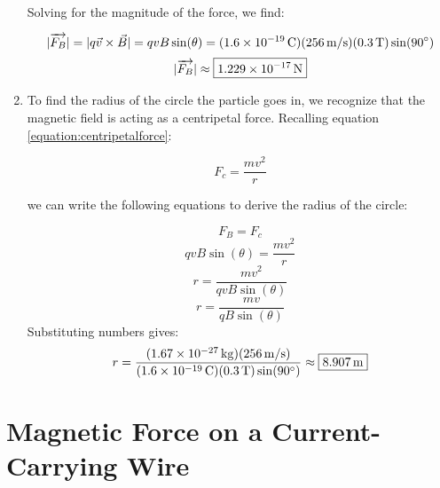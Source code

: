 \begin{mdframed}[backgroundcolor=blue!10!white]
\begin{enumerate}[label=(\alph*)]
	  Solving for the magnitude of the force, we find:
	  
	  	\begin{equation*}
	  	|\overrightarrow{F_B}| = |{q \vec{v} \times \vec{B}}| = qvB \sin(\theta) = (\SI{1.6E-19}{C})(\SI{256}{m/s})(\SI{0.3}{T}) \sin(90 \degree) 
	  \end{equation*}
  	\begin{equation*}
  	|\overrightarrow{F_B}| \approx \boxed{\SI{1.229E-17}{N}}
  	\end{equation*}
	
		\item To find the radius of the circle the particle goes in, we recognize that the magnetic field is acting as a centripetal force.  Recalling equation \ref{equation:centripetalforce}:
		
		\begin{equation*}
			F_c = \frac{mv^2}{r}
		\end{equation*}
		
		
		we can write the following equations to derive the radius of the circle:
			
		\begin{equation*}
			F_B = F_c
		\end{equation*}
		\begin{equation*}
			 qvB \sin(\theta) = \frac{mv^2}{r} 
		\end{equation*}
		\begin{equation*}
			r = \frac{mv^2}{qvB \sin(\theta)}
		\end{equation*}
	\begin{equation*}
		r = \frac{mv}{qB \sin(\theta)}
	\end{equation*}
	Substituting numbers gives:
		\begin{equation*}
		r = \frac{(\SI{1.67E-27}{kg}) (\SI{256}{m/s})} {(\SI{1.6E-19}{C}) (\SI{0.3}{T}) \sin(90 \degree)} \approx \boxed{\SI{8.907}{m}}
	\end{equation*}
	
	
	\end{enumerate}
		
	\end{mdframed}
	
	
	
	
	
	
	\section{Magnetic Force on a Current-Carrying Wire}
	
